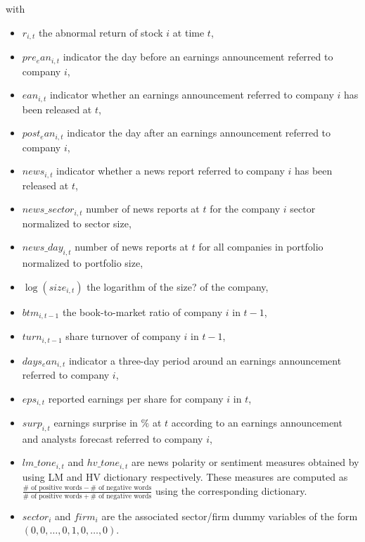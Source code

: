 \documentclass[]{article}
\begin{document}
with

\begin{itemize}
\item
  \(r_{i,t}\) the abnormal return of stock \(i\) at time \(t\),
\item
  \(pre_ean_{i,t}\) indicator the day before an earnings announcement referred to company \(i\),
\item
  \(ean_{i,t}\) indicator whether an earnings announcement referred to company \(i\) has been released at \(t\),
\item
  \(post_ean_{i,t}\) indicator the day after an earnings announcement referred to company \(i\),
\item
  \(news_{i,t}\) indicator whether a news report referred to company \(i\) has been released at \(t\),
\item
  \(news\_sector_{i,t}\) number of news reports at \(t\) for the company \(i\) sector normalized to sector size,
\item
  \(news\_day_{i,t}\) number of news reports at \(t\) for all companies in portfolio normalized to portfolio size,
\item
  \(\log(size_{i,t})\) the logarithm of the size? of the company,
\item
  \(btm_{i,t-1}\) the book-to-market ratio of company \(i\) in \(t-1\),
\item
  \(turn_{i,t-1}\) share turnover of company \(i\) in \(t-1\),
\item
  \(days_ean_{i,t}\) indicator a three-day period around an earnings announcement referred to company \(i\),
\item
  \(eps_{i,t}\) reported earnings per share for company \(i\) in \(t\),
\item
  \(surp_{i,t}\) earnings surprise in \(\%\) at \(t\) according to an earnings announcement and analysts forecast referred to company \(i\),
\item
  \(lm\_tone_{i,t}\) and \(hv\_tone_{i,t}\) are news polarity or sentiment measures obtained by using LM and HV dictionary respectively. These measures are computed as \(\frac{\#\text{ of positive words} - \# \text{ of negative words}}{\#\text{ of positive words}+\# \text{ of negative words}}\) using the corresponding dictionary.
\item
  \(sector_{i}\) and \(firm_{i}\) are the associated sector/firm dummy variables of the form \((0,0,\ldots,0,1,0,\ldots,0)\).
\end{itemize}
\end{document}
